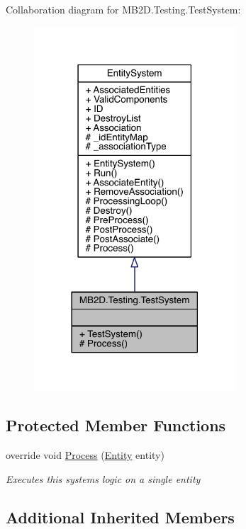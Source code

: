 Collaboration diagram for M\+B2\+D.\+Testing.\+Test\+System\+:
\nopagebreak
\begin{figure}[H]
\begin{center}
\leavevmode
\includegraphics[width=213pt]{class_m_b2_d_1_1_testing_1_1_test_system__coll__graph}
\end{center}
\end{figure}
\subsection*{Protected Member Functions}
\begin{DoxyCompactItemize}
\item 
override void \hyperlink{class_m_b2_d_1_1_testing_1_1_test_system_a35d160e6e7e8ffb8f1a6cf403b00ef40}{Process} (\hyperlink{class_m_b2_d_1_1_entity_component_1_1_entity}{Entity} entity)
\begin{DoxyCompactList}\small\item\em Executes this systems logic on a single entity \end{DoxyCompactList}\end{DoxyCompactItemize}
\subsection*{Additional Inherited Members}


